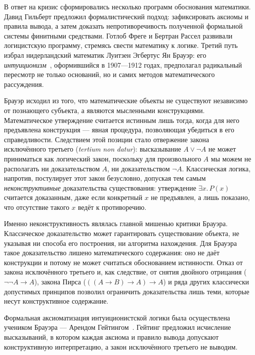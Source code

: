 \documentclass[14pt, russian]{scrartcl}
\begin{document}
В ответ на кризис сформировались несколько программ обоснования математики.
Давид Гильберт предложил формалистический подход: зафиксировать аксиомы и
правила вывода, а затем доказать непротиворечивость полученной формальной
системы финитными средствами. Готлоб Фреге и Бертран Рассел развивали
логицистскую программу, стремясь свести математику к логике. Третий путь
избрал нидерландский математик Луитзен Эгбертус Ян Брауэр: его
\emph{интуиционизм}~\cite{Brouwer1975}, оформившийся в 1907---1912 годах,
предполагал радикальный пересмотр не только оснований, но и самих методов
математического рассуждения.

Брауэр исходил из того, что математические объекты не существуют независимо от
познающего субъекта, а являются мысленными конструкциями. Математическое
утверждение считается истинным лишь тогда, когда для него предъявлена
конструкция --- явная процедура, позволяющая убедиться в его справедливости.
Следствием этой позиции стало отвержение закона исключённого третьего
(\emph{tertium non datur}): высказывание $A \lor \neg A$ не может приниматься
как логический закон, поскольку для произвольного $A$ мы можем не располагать ни
доказательством $A$, ни доказательством $\neg A$. Классическая логика, напротив,
постулирует этот закон безусловно, допуская тем самым \emph{неконструктивные}
доказательства существования: утверждение $\exists x.\, P(x)$ считается
доказанным, даже если конкретный $x$ не предъявлен, а лишь показано, что
отсутствие такого $x$ ведёт к противоречию.

Именно неконструктивность являлась главной мишенью критики Брауэра.
Классическое доказательство может гарантировать существование объекта, не
указывая ни способа его построения, ни алгоритма нахождения. Для Брауэра такое
доказательство лишено математического содержания: оно не даёт конструкции и
потому не может считаться обоснованием истинности. Отказ от закона исключённого
третьего и, как следствие, от снятия двойного отрицания ($\neg\neg A \rightarrow
A$), закона Пирса ($((A \rightarrow B) \rightarrow A) \rightarrow A$) и ряда
других классически допустимых принципов позволил ограничить доказательства лишь
теми, которые несут конструктивное содержание.

Формальная аксиоматизация интуиционистской логики была осуществлена учеником
Брауэра --- Арендом Гейтингом~\cite{Heyting1956}. Гейтинг предложил исчисление
высказываний, в котором каждая аксиома и правило вывода допускают конструктивную
интерпретацию, а закон исключённого третьего не выводим.
\end{document}
